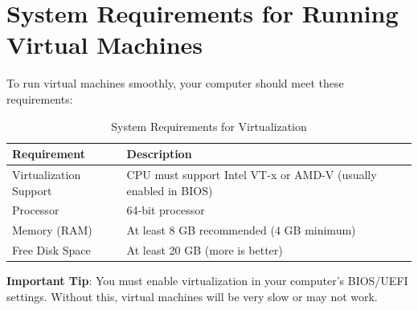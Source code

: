 \section{System Requirements for Running Virtual Machines}
To run virtual machines smoothly, your computer should meet these requirements:
\begin{table}[h]
  \begin{tabular}{ l l }
    \hline
    \textbf{Requirement} & \textbf{Description} \\
    \hline
    Virtualization Support & CPU must support Intel VT-x or AMD-V (usually enabled in BIOS) \\
    Processor & 64-bit processor \\
    Memory (RAM) & At least 8 GB recommended (4 GB minimum) \\
    Free Disk Space & At least 20 GB (more is better) \\
    \hline
  \end{tabular}
  \caption{System Requirements for Virtualization}
  \label{tab:uno}
\end{table}
\newpage
\noindent
\textbf{Important Tip}: You must enable virtualization in your computer's BIOS/UEFI settings.
Without this, virtual machines will be very slow or may not work.

